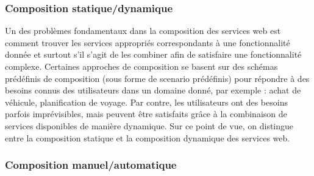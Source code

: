       \subsubsection{Composition statique/dynamique}
      \label{sec:comp-stat}
      Un des problèmes fondamentaux dans la composition des services
      web est comment trouver les services appropriés correspondants à
      une fonctionnalité donnée et surtout s'il s'agit de les combiner
      afin de satisfaire une fonctionnalité complexe. Certaines
      approches de composition se basent sur des schémas prédéfinis de
      composition (sous forme de scenario prédéfinis) pour répondre à
      des besoins connus des utilisateurs dans un domaine donné, par
      exemple : achat de véhicule, planification de voyage. Par
      contre, les utilisateurs ont des besoins parfois imprévisibles,
      mais peuvent être satisfaits grâce à la combinaison de services
      disponibles de manière dynamique. Sur ce point de vue, on
      distingue entre la composition statique et la composition
      dynamique des services web.

      \subsubsection{Composition manuel/automatique}
      \label{sec:comp-manu}




